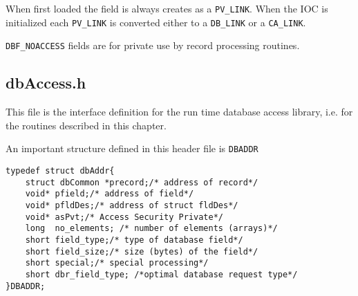 When first loaded the field is always creates as a \verb|PV_LINK|.
When the IOC is initialized each \verb|PV_LINK| is converted either to a \verb|DB_LINK| or a \verb|CA_LINK|.

\verb|DBF_NOACCESS| fields are for private use by record processing routines.

\subsection{dbAccess.h}

This file is the interface definition for the run time database access library, i.e. for the routines described in this chapter.

An important structure defined in this header file is \verb|DBADDR|

\begin{verbatim}
typedef struct dbAddr{
    struct dbCommon *precord;/* address of record*/
    void* pfield;/* address of field*/
    void* pfldDes;/* address of struct fldDes*/
    void* asPvt;/* Access Security Private*/
    long  no_elements; /* number of elements (arrays)*/
    short field_type;/* type of database field*/
    short field_size;/* size (bytes) of the field*/
    short special;/* special processing*/
    short dbr_field_type; /*optimal database request type*/
}DBADDR;
\end{verbatim}

